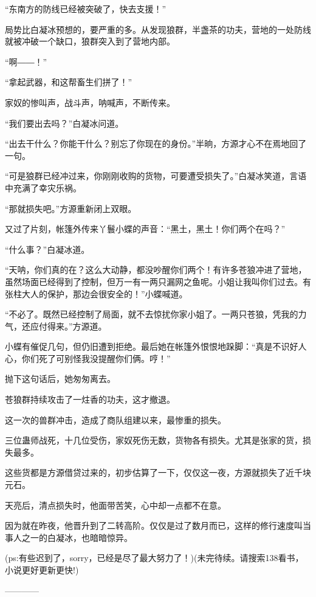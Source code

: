 \begin{this_body}
“东南方的防线已经被突破了，快去支援！”

局势比白凝冰预想的，要严重的多。从发现狼群，半盏茶的功夫，营地的一处防线就被冲破一个缺口，狼群突入到了营地内部。

“啊――！”

“拿起武器，和这帮畜生们拼了！”

家奴的惨叫声，战斗声，呐喊声，不断传来。

“我们要出去吗？”白凝冰问道。

“出去干什么？你能干什么？别忘了你现在的身份。”半晌，方源才心不在焉地回了一句。

“可是狼群已经冲过来，你刚刚收购的货物，可要遭受损失了。”白凝冰笑道，言语中充满了幸灾乐祸。

“那就损失吧。”方源重新闭上双眼。

又过了片刻，帐篷外传来丫鬟小蝶的声音：“黑土，黑土！你们两个在吗？”

“什么事？”白凝冰道。

“天呐，你们真的在？这么大动静，都没吵醒你们两个！有许多苍狼冲进了营地，虽然场面已经得到了控制，但万一有一两只漏网之鱼呢。小姐让我叫你们过去。有张柱大人的保护，那边会很安全的！”小蝶喊道。

“不必了。既然已经控制了局面，就不去惊扰你家小姐了。一两只苍狼，凭我的力气，还应付得来。”方源道。

小蝶有催促几句，但仍旧遭到拒绝。最后她在帐篷外恨恨地跺脚：“真是不识好人心，你们死了可别怪我没提醒你们俩。哼！”

抛下这句话后，她匆匆离去。

苍狼群持续攻击了一炷香的功夫，这才撤退。

这一次的兽群冲击，造成了商队组建以来，最惨重的损失。

三位蛊师战死，十几位受伤，家奴死伤无数，货物各有损失。尤其是张家的货，损失最多。

这些货都是方源借贷过来的，初步估算了一下，仅仅这一夜，方源就损失了近千块元石。

天亮后，清点损失时，他面带苦笑，心中却一点都不在意。

因为就在昨夜，他晋升到了二转高阶。仅仅是过了数月而已，这样的修行速度叫当事人之一的白凝冰，也暗暗惊异。

(ps:有些迟到了，sorry，已经是尽了最大努力了！)(未完待续。请搜索138看书，小说更好更新更快!)

------------

\end{this_body}

